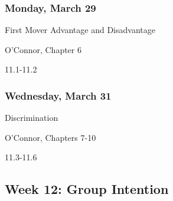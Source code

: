 \documentclass[
]{article}
\providecommand{\tightlist}{%
  \setlength{\itemsep}{0pt}\setlength{\parskip}{0pt}}
\begin{document}
\begin{multicols}{2}

\hypertarget{monday-march-29}{%
\subsubsection{Monday, March 29}\label{monday-march-29}}

\begin{description}
\tightlist
\item[Topic]
First Mover Advantage and Disadvantage
\item[Reading]
O'Connor, Chapter 6
\item[Lectures]
11.1-11.2
\end{description}

\hypertarget{wednesday-march-31}{%
\subsubsection{Wednesday, March 31}\label{wednesday-march-31}}

\begin{description}
\tightlist
\item[Topic]
Discrimination
\item[Reading]
O'Connor, Chapters 7-10
\item[Lectures]
11.3-11.6
\end{description}

\end{multicols}

\newpage

\hypertarget{week-12-group-intention}{%
\subsection{Week 12: Group Intention}\label{week-12-group-intention}}
\end{document}
